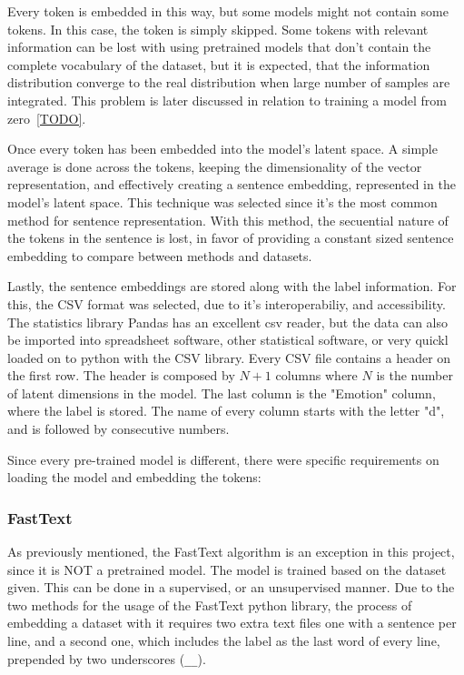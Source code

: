 Every token is embedded in this way, but some models might not contain some tokens. In this case, the token is simply skipped. Some tokens with relevant information can be lost with using pretrained models that don't contain the complete vocabulary of the dataset, but it is expected, that the information distribution converge to the real distribution when large number of samples are integrated. This problem is later discussed in relation to training a model from zero~\ref{TODO}.

Once every token has been embedded into the model's latent space. A simple average is done across the tokens, keeping the dimensionality of the vector representation, and effectively creating a sentence embedding, represented in the model's latent space. This technique was selected since it's the most common \cite{TODO} method for sentence representation. With this method, the secuential nature of the tokens in the sentence is lost, in favor of providing a constant sized sentence embedding to compare between methods and datasets.

Lastly, the sentence embeddings are stored along with the label information. For this, the CSV format was selected, due to it's interoperabiliy, and accessibility. The statistics library Pandas has an excellent csv reader, but the data can also be imported into spreadsheet software, other statistical software, or very quickl loaded on to python with the CSV library. Every CSV file contains a header on the first row. The header is composed by $N+1$ columns where $N$ is the number of latent dimensions in the model. The last column is the "Emotion" column, where the label is stored. The name of every column starts with the letter "d", and is followed by consecutive numbers.

Since every pre-trained model is different, there were specific requirements on loading the model and embedding the tokens:

\subsubsection{FastText}\label{subs:FastText}
As previously mentioned, the FastText algorithm is an exception in this project, since it is NOT a pretrained model. The model is trained based on the dataset given. This can be done in a supervised, or an unsupervised manner. Due to the two methods for the usage of the FastText python library, the process of embedding a dataset with it requires two extra text files one with a sentence per line, and a second one, which includes the label as the last word of every line, prepended by two underscores (\lstinline{__}).

